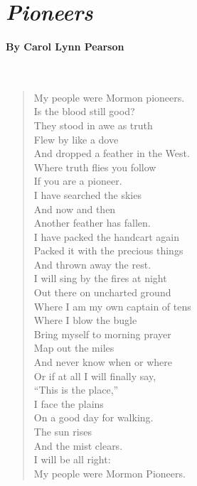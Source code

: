 \documentclass[12pt, openany, letterpaper]{memoir}
\begin{document}
\newpage
\pagestyle{empty}
\addtocounter{page}{-1}
\section*{\emph{Pioneers}}
\paragraph{By Carol Lynn Pearson}~
\begin{verse}
	My people were Mormon pioneers.\\
	Is the blood still good?\\
	They stood in awe as truth\\
	Flew by like a dove\\
	And dropped a feather in the West.\\
	Where truth flies you follow\\
	If you are a pioneer.\\
	I have searched the skies\\
	And now and then\\
	Another feather has fallen.\\
	I have packed the handcart again\\
	Packed it with the precious things\\
	And thrown away the rest.\\
	I will sing by the fires at night\\
	Out there on uncharted ground\\
	Where I am my own captain of tens\\
	Where I blow the bugle\\
	Bring myself to morning prayer\\
	Map out the miles\\
	And never know when or where\\
	Or if at all I will finally say,\\
	“This is the place,”\\
	I face the plains\\
	On a good day for walking.\\
	The sun rises\\
	And the mist clears.\\
	I will be all right:\\
	My people were Mormon Pioneers.
\end{verse}
\end{document}
